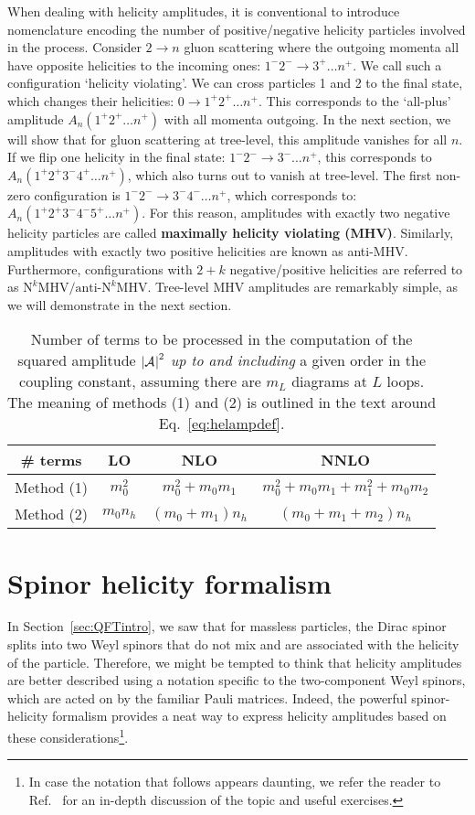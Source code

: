 \documentclass[main.tex]{subfiles}
\begin{document}
When dealing with helicity amplitudes, it is conventional to introduce nomenclature encoding the number of positive/negative helicity particles involved in the process. Consider $2\rightarrow n$ gluon scattering where the outgoing momenta all have opposite helicities to the incoming ones: $1^-2^- \rightarrow 3^+ \ldots n^+$. We call such a configuration `helicity violating'. We can cross particles 1 and 2 to the final state, which changes their helicities: $0\rightarrow 1^+2^+ \ldots n^+$. This corresponds to the `all-plus' amplitude $A_n(1^+2^+ \ldots n^+)$ with all momenta outgoing. In the next section, we will show that for gluon scattering at tree-level, this amplitude vanishes for all $n$. If we flip one helicity in the final state: $1^-2^- \rightarrow 3^- \ldots n^+$, this corresponds to $A_n(1^+2^+3^-4^+ \ldots n^+)$, which also turns out to vanish at tree-level. The first non-zero configuration is $1^-2^- \rightarrow 3^-4^- \ldots n^+$, which corresponds to: $A_n(1^+2^+3^-4^-5^+ \ldots n^+)$. For this reason, amplitudes with exactly two negative helicity particles are called \textbf{maximally helicity violating (MHV)}. Similarly, amplitudes with exactly two positive helicities are known as anti-MHV. Furthermore, configurations with $2+k$ negative/positive helicities are referred to as $\text{N}^k\text{MHV}/\text{anti-N}^k\text{MHV}$. Tree-level MHV amplitudes are remarkably simple, as we will demonstrate in the next section. 
\begin{table}[t]
	\begin{center}
		\begin{tabular}{c|c|c|c}
			  \# terms & LO & NLO & NNLO \\
			\hline
			Method (1) & $m_0^2$ & $m_0^2 + m_0 m_1$ & $m_0^2 + m_0 m_1 + m_1^2 + m_0 m_2$ \\
			Method (2) & $m_0 n_h$ & $(m_0+m_1)n_h$ & $(m_0+m_1+m_2)n_h$ \\
		\end{tabular}
	\end{center}
 \caption{Number of terms to be processed in the computation of the squared amplitude $\left|\mathcal{A}_{}^{}\right|^2$ \textit{up to and including} a given order in the coupling constant, assuming there are $m_L$ diagrams at $L$ loops. The meaning of methods (1) and (2) is outlined in the text around Eq.~\ref{eq:helampdef}.}
 \label{tab:nterms}
\end{table}
\section{Spinor helicity formalism} \label{sec:spinhelform}
In Section~\ref{sec:QFTintro}, we saw that for massless particles, the Dirac spinor splits into two Weyl spinors that do not mix and are associated with the helicity of the particle. Therefore, we might be tempted to think that helicity amplitudes are better described using a notation specific to the two-component Weyl spinors, which are acted on by the familiar Pauli matrices. Indeed, the powerful spinor-helicity formalism provides a neat way to express helicity amplitudes based on these considerations\footnote{In case the notation that follows appears daunting, we refer the reader to Ref.~\cite{ElvangHuang} for an in-depth discussion of the topic and useful exercises.}.
\end{document}
